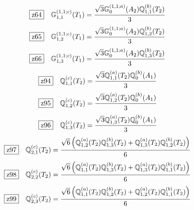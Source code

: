 \documentclass[fleqn,10pt,landscape]{jsarticle}
\begin{document}
\begin{dmath*}
\hspace*{3mm}\fbox{z64}\quad \mathbb{G}_{1,1}^{(1,1;c)}(T_{1})=\frac{\sqrt{3} \mathbb{G}_{0}^{(1,1;a)}(A_{2}) \mathbb{Q}_{1,1}^{(b)}(T_{2})}{3}
\end{dmath*}
\begin{dmath*}
\hspace*{3mm}\fbox{z65}\quad \mathbb{G}_{1,2}^{(1,1;c)}(T_{1})=\frac{\sqrt{3} \mathbb{G}_{0}^{(1,1;a)}(A_{2}) \mathbb{Q}_{1,2}^{(b)}(T_{2})}{3}
\end{dmath*}
\begin{dmath*}
\hspace*{3mm}\fbox{z66}\quad \mathbb{G}_{1,3}^{(1,1;c)}(T_{1})=\frac{\sqrt{3} \mathbb{G}_{0}^{(1,1;a)}(A_{2}) \mathbb{Q}_{1,3}^{(b)}(T_{2})}{3}
\end{dmath*}
\begin{dmath*}
\hspace*{3mm}\fbox{z94}\quad \mathbb{Q}_{1,1}^{(c)}(T_{2})=\frac{\sqrt{3} \mathbb{Q}_{1,1}^{(a)}(T_{2}) \mathbb{Q}_{0}^{(b)}(A_{1})}{3}
\end{dmath*}
\begin{dmath*}
\hspace*{3mm}\fbox{z95}\quad \mathbb{Q}_{1,2}^{(c)}(T_{2})=\frac{\sqrt{3} \mathbb{Q}_{1,2}^{(a)}(T_{2}) \mathbb{Q}_{0}^{(b)}(A_{1})}{3}
\end{dmath*}
\begin{dmath*}
\hspace*{3mm}\fbox{z96}\quad \mathbb{Q}_{1,3}^{(c)}(T_{2})=\frac{\sqrt{3} \mathbb{Q}_{1,3}^{(a)}(T_{2}) \mathbb{Q}_{0}^{(b)}(A_{1})}{3}
\end{dmath*}
\begin{dmath*}
\hspace*{3mm}\fbox{z97}\quad \mathbb{Q}_{2,1}^{(c)}(T_{2})=\frac{\sqrt{6} \left(\mathbb{Q}_{1,2}^{(a)}(T_{2}) \mathbb{Q}_{1,3}^{(b)}(T_{2}) + \mathbb{Q}_{1,3}^{(a)}(T_{2}) \mathbb{Q}_{1,2}^{(b)}(T_{2})\right)}{6}
\end{dmath*}
\begin{dmath*}
\hspace*{3mm}\fbox{z98}\quad \mathbb{Q}_{2,2}^{(c)}(T_{2})=\frac{\sqrt{6} \left(\mathbb{Q}_{1,1}^{(a)}(T_{2}) \mathbb{Q}_{1,3}^{(b)}(T_{2}) + \mathbb{Q}_{1,3}^{(a)}(T_{2}) \mathbb{Q}_{1,1}^{(b)}(T_{2})\right)}{6}
\end{dmath*}
\begin{dmath*}
\hspace*{3mm}\fbox{z99}\quad \mathbb{Q}_{2,3}^{(c)}(T_{2})=\frac{\sqrt{6} \left(\mathbb{Q}_{1,1}^{(a)}(T_{2}) \mathbb{Q}_{1,2}^{(b)}(T_{2}) + \mathbb{Q}_{1,2}^{(a)}(T_{2}) \mathbb{Q}_{1,1}^{(b)}(T_{2})\right)}{6}
\end{dmath*}
\end{document}
